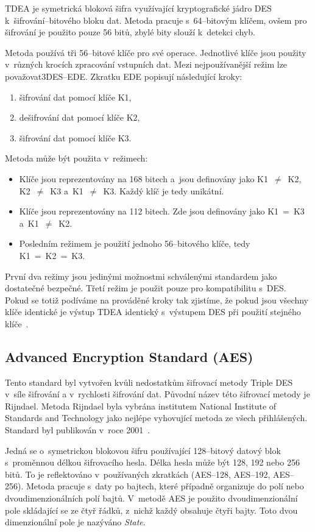 TDEA je symetrická bloková šifra využívající kryptografické jádro DES k~šifrování--bitového bloku
dat. Metoda pracuje s~64--bitovým klíčem, ovšem pro šifrování je použito pouze 56 bitů, zbylé bity
slouží k~detekci chyb. 

Metoda používá tři 56--bitové klíče pro své operace. Jednotlivé klíče jsou použity v~různých krocích
zpracování vstupních dat. Mezi nejpoužívanější režim lze považovat\linebreak 3DES--EDE. Zkratku EDE popisují
následující kroky:
\begin{enumerate}
    \item šifrování dat pomocí klíče K1,
    \item dešifrování dat pomocí klíče K2,
    \item šifrování dat pomocí klíče K3.
\end{enumerate}
Metoda může být použita v~režimech:
\begin{itemize}
    \item Klíče jsou reprezentovány na 168 bitech a~jsou definovány jako K1~$\neq$~K2, K2~$\neq$~K3
        a~K1~$\neq$~K3. Každý klíč je tedy unikátní.
    \item Klíče jsou reprezentovány na 112 bitech. Zde jsou definovány jako K1~=~K3 a~K1~$\neq$~K2.
    \item Posledním režimem je použití jednoho 56--bitového klíče, tedy K1~=~K2~=~K3.
\end{itemize}
První dva režimy jsou jedinými možnostmi schválenými standardem jako dostatečné bezpečné. Třetí
režim je použit pouze pro kompatibilitu s~DES. Pokud se totiž podíváme na prováděné kroky tak
zjistíme, že pokud jsou všechny klíče identické je výstup TDEA identický s~výstupem DES při
použití stejného klíče~\cite{NIST:2012}.

\subsection{Advanced Encryption Standard (AES)}
    \label{ssec:AES}
Tento standard byl vytvořen kvůli nedostatkům šifrovací metody Triple DES v~síle šifrování a
v~rychlosti šifrování dat. Původní název této šifrovací metody je Rijndael. Metoda Rijndael byla
vybrána institutem National Institute of Standards and Technology jako nejlépe vyhovující metoda ze
všech přihlášených. Standard byl publikován v~roce 2001~\cite{NIST:2001}.

Jedná se o~symetrickou blokovou šifru používající 128--bitový datový blok s~proměnnou délkou
šifrovacího hesla. Délka hesla může být 128, 192 nebo 256 bitů. To je reflektováno v~používaných
zkratkách (AES--128, AES--192, AES--256). Metoda pracuje s~daty po bajtech, které případně organizuje
do polí nebo dvoudimenzionálních polí bajtů. V~metodě AES je použito dvoudimenzionální pole
skládající se ze čtyř řádků, z~nichž každý obsahuje čtyři bajty. Toto dvou dimenzionální pole je
nazýváno {\it State}.

